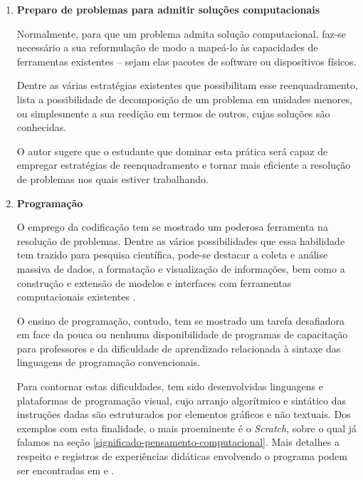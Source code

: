 \begin{enumerate}
  \item \textbf{Preparo de problemas para admitir soluções computacionais}


  Normalmente, para que um problema admita solução computacional, faz-se necessário a sua reformulação de modo a mapeá-lo às capacidades de ferramentas existentes -- sejam elas pacotes de software ou dispositivos físicos. 

  Dentre as várias estratégias existentes que possibilitam esse reenquadramento,   lista a possibilidade de decomposição de um problema em unidades menores, ou simplesmente a sua reedição em termos de outros, cujas soluções são conhecidas. 

  O autor sugere que o estudante que dominar esta prática será capaz de empregar estratégias de reenquadramento e tornar mais eficiente a resolução de problemas nos quais estiver trabalhando. 

  \item \textbf{Programação} 

  O emprego da codificação tem se mostrado um poderosa ferramenta na resolução de problemas. Dentre as vários possibilidades que essa habilidade tem trazido para pesquisa científica, pode-se destacar a coleta e análise massiva de dados, a formatação e visualização de informações, bem como a construção e extensão de modelos e interfaces com ferramentas computacionais existentes \cite{Weintrop2016}. 
  
  O ensino de programação, contudo, tem se mostrado um tarefa desafiadora em face da pouca ou nenhuma disponibilidade de programas de capacitação para professores e da dificuldade de aprendizado relacionada à sintaxe das linguagens de programação convencionais. 
  
  Para contornar estas dificuldades, tem sido desenvolvidas linguagens e plataformas de programação visual, cujo arranjo algorítmico e sintático das instruções dadas são estruturados por elementos gráficos e não textuais. Dos exemplos com esta finalidade, o mais proeminente é o \textit{Scratch}, sobre o qual já falamos na seção \ref{significado-pensamento-computacional}. Mais detalhes a respeito e registros de experiências didáticas envolvendo o programa podem ser encontradas em  e .


\end{enumerate}
